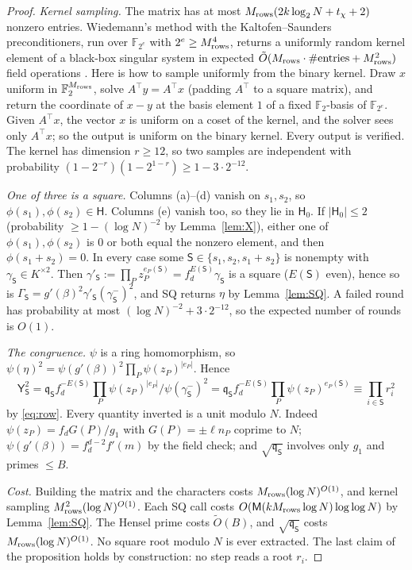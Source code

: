 \documentclass[11pt]{amsart}
\theoremstyle{definition}
\newcommand{\F}{\mathbb{F}}
\newcommand{\sH}{\mathsf{H}}
\newcommand{\sS}{\mathsf{S}}
\newcommand{\sY}{\mathsf{Y}}
\newcommand{\fq}{\mathfrak{q}}
\begin{document}
\begin{proof}
\emph{Kernel sampling.} The matrix has at most $M_{\rm rows}(2k\log_2N+t_\chi+2)$ nonzero entries. Wiedemann's method with the Kaltofen--Saunders preconditioners,
run over $\F_{2^e}$ with $2^e\ge M_{\rm rows}^4$, returns a uniformly random kernel element of a black-box singular system in expected
$\tilde O(M_{\rm rows}\cdot\#\text{entries}+M_{\rm rows}^2)$ field operations \cite[Thms.~2--4]{kaltofensaunders1991}. Here is how to sample uniformly from the binary
kernel. Draw $x$ uniform in $\F_2^{M_{\rm rows}}$, solve $A^\top y=A^\top x$ (padding $A^\top$ to a square matrix), and return the coordinate of $x-y$ at the basis
element $1$ of a fixed $\F_2$-basis of $\F_{2^e}$. Given $A^\top x$, the vector $x$ is uniform on a coset of the kernel, and the solver sees only $A^\top x$; so
the output is uniform on the binary kernel. Every output is verified. The kernel has dimension $r\ge12$, so two samples are independent with probability
$(1-2^{-r})(1-2^{1-r})\ge1-3\cdot2^{-12}$.

\emph{One of three is a square.} Columns (a)--(d) vanish on $s_1,s_2$, so $\phi(s_1),\phi(s_2)\in\sH$. Columns (e) vanish too, so they lie in $\sH_0$. If
$|\sH_0|\le2$ (probability $\ge1-(\log N)^{-2}$ by Lemma~\ref{lem:X}), either one of $\phi(s_1),\phi(s_2)$ is $0$ or both equal the
nonzero element, and then $\phi(s_1+s_2)=0$. In every case some $\sS\in\{s_1,s_2,s_1+s_2\}$ is nonempty with $\gamma_\sS\in K^{\times2}$. Then
$\gamma'_\sS:=\prod_Pz_P^{e_P(\sS)}=f_d^{E(\sS)}\gamma_\sS$ is a square ($E(\sS)$ even), hence so is $\Gamma_\sS=g'(\beta)^2\gamma'_\sS(\gamma_\sS^-)^2$, and SQ returns $\eta$
by Lemma~\ref{lem:SQ}. A failed round has probability at most $(\log N)^{-2}+3\cdot2^{-12}$, so the expected number of rounds is $O(1)$.

\emph{The congruence.} $\psi$ is a ring homomorphism, so $\psi(\eta)^2=\psi(g'(\beta))^2\prod_P\psi(z_P)^{|e_P|}$. Hence
\[
\sY_\sS^2=\fq_\sS f_d^{-E(\sS)}\prod_P\psi(z_P)^{|e_P|}\big/\psi(\gamma^-_\sS)^2=\fq_\sS f_d^{-E(\sS)}\prod_P\psi(z_P)^{e_P(\sS)}\equiv\prod_{i\in\sS}r_i^2
\]
by \eqref{eq:row}. Every quantity inverted is a unit modulo $N$. Indeed $\psi(z_P)=f_dG(P)/g_1$ with $G(P)=\pm\ell n_P$ coprime to $N$;
$\psi(g'(\beta))=f_d^{d-2}f'(m)$ by the field check; and $\sqrt{\fq_\sS}$ involves only $g_1$ and primes $\le B$.

\emph{Cost.} Building the matrix and the characters costs $M_{\rm rows}(\log N)^{O(1)}$, and kernel sampling $M_{\rm rows}^2(\log N)^{O(1)}$. Each SQ call costs
$O(\mathsf M(kM_{\rm rows}\log N)\log\log N)$ by Lemma~\ref{lem:SQ}. The Hensel prime costs $\tilde O(B)$, and $\sqrt{\fq_\sS}$ costs $M_{\rm rows}(\log N)^{O(1)}$. No square
root modulo $N$ is ever extracted. The last claim of the proposition holds by construction: no step reads a root $r_i$.
\end{proof}
\end{document}
